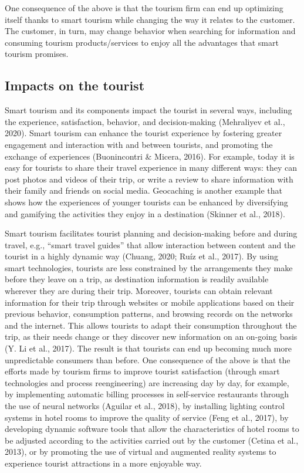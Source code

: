 \documentclass[
  letterpaper,
  DIV=11,
  numbers=noendperiod]{scrreprt}
\begin{document}
One consequence of the above is that the tourism firm can end up
optimizing itself thanks to smart tourism while changing the way it
relates to the customer. The customer, in turn, may change behavior when
searching for information and consuming tourism products/services to
enjoy all the advantages that smart tourism promises.

\hypertarget{impacts-on-the-tourist}{%
\subsection{Impacts on the tourist}\label{impacts-on-the-tourist}}

Smart tourism and its components impact the tourist in several ways,
including the experience, satisfaction, behavior, and decision-making
(Mehraliyev et al., 2020). Smart tourism can enhance the tourist
experience by fostering greater engagement and interaction with and
between tourists, and promoting the exchange of experiences
(Buonincontri \& Micera, 2016). For example, today it is easy for
tourists to share their travel experience in many different ways: they
can post photos and videos of their trip, or write a review to share
information with their family and friends on social media. Geocaching is
another example that shows how the experiences of younger tourists can
be enhanced by diversifying and gamifying the activities they enjoy in a
destination (Skinner et al., 2018).

Smart tourism facilitates tourist planning and decision-making before
and during travel, e.g., ``smart travel guides'' that allow interaction
between content and the tourist in a highly dynamic way (Chuang, 2020;
Ruíz et al., 2017). By using smart technologies, tourists are less
constrained by the arrangements they make before they leave on a trip,
as destination information is readily available wherever they are during
their trip. Moreover, tourists can obtain relevant information for their
trip through websites or mobile applications based on their previous
behavior, consumption patterns, and browsing records on the networks and
the internet. This allows tourists to adapt their consumption throughout
the trip, as their needs change or they discover new information on an
on-going basis (Y. Li et al., 2017). The result is that tourists can end
up becoming much more unpredictable consumers than before. One
consequence of the above is that the efforts made by tourism firms to
improve tourist satisfaction (through smart technologies and process
reengineering) are increasing day by day, for example, by implementing
automatic billing processes in self-service restaurants through the use
of neural networks (Aguilar et al., 2018), by installing lighting
control systems in hotel rooms to improve the quality of service (Feng
et al., 2017), by developing dynamic software tools that allow the
characteristics of hotel rooms to be adjusted according to the
activities carried out by the customer (Cetina et al., 2013), or by
promoting the use of virtual and augmented reality systems to experience
tourist attractions in a more enjoyable way.
\end{document}
